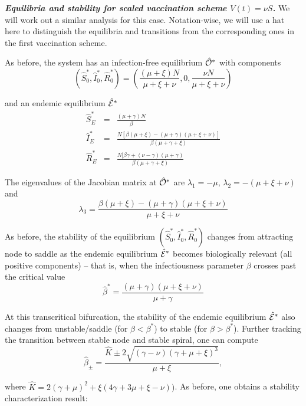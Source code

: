 \documentclass[10pt]{article}
\begin{document}

\vspace{5mm}
\noindent \textbf{\emph{Equilibria and stability for scaled vaccination scheme $V(t) = \nu S$.}} We will work out a similar analysis for this case. Notation-wise, we will use a hat here to distinguish the equilibria and transitions from the corresponding ones in the first vaccination scheme.

\vspace{2mm}
\noindent As before, the system has an infection-free equilibrium $\hat{\cal O}^*$ with components
\begin{equation}
(\hat{S}_0^*,\hat{I}_0^*,\hat{R}_0^*) = \left( \frac{(\mu+\xi)N}{\mu + \xi+\nu}, 0, \frac{\nu N}{\mu + \xi + \nu} \right)
\end{equation}

\noindent and an endemic equilibrium $\hat{\cal E}^*$
\begin{eqnarray}
\hat{S}_E^* &=& \frac{(\mu + \gamma)N}{\beta}\\
\hat{I}_E^* &=& \frac{N[\beta(\mu+\xi)-(\mu+\gamma)(\mu+ \xi+\nu)]}{\beta(\mu + \gamma +\xi)}\\
\hat{R}_E^* &=& \frac{N[\beta \gamma +(\nu-\gamma)(\mu + \gamma)}{\beta(\mu + \gamma +\xi)}
\end{eqnarray}

\noindent The eigenvalues of the Jacobian matrix at $\hat{\cal O}^*$ are $\lambda_1 = -\mu$, $\lambda_2 = -(\mu+\xi+\nu)$ and 
$$\lambda_3 = \frac{\beta(\mu+\xi)-(\mu+\gamma)(\mu+\xi+\nu)}{\mu+\xi+\nu}$$

\noindent As before, the stability of the equilibrium $(\hat{S}_0^*,\hat{I}_0^*,\hat{R}_0^*)$ changes from attracting node to saddle as the endemic equilibrium $\hat{\cal E}^*$ becomes biologically relevant (all positive components) -- that is, when the infectiousness parameter $\beta$ crosses past the critical value
$$\hat{\beta}^* = \frac{(\mu+\gamma)(\mu+\xi+\nu)}{\mu+\gamma}$$

\noindent At this transcritical bifurcation, the stability of the endemic equilibrium $\hat{\cal E}^*$ also changes from unstable/saddle (for $\beta<\beta^*$) to stable (for $\beta>\beta^*$). Further tracking the transition between stable node and stable spiral, one can compute 
$$\hat{\beta}_{\pm} = \frac{\hat{K} \pm 2\sqrt{(\gamma-\nu)(\gamma+\mu+\xi)^3}}{\mu+\xi},$$

\noindent where $\hat{K} = 2(\gamma+\mu)^2 + \xi(4\gamma+3\mu+\xi-\nu))$. As before, one obtains a stability characterization result:
\end{document}

